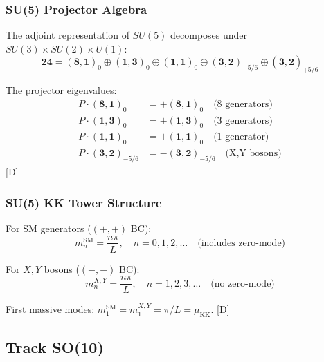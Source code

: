 \documentclass[11pt,a4paper]{article}
\newcommand{\tagD}{\textcolor{blue!70!black}{[D]}}
\begin{document}
\subsubsection{SU(5) Projector Algebra}

The adjoint representation of $SU(5)$ decomposes under $SU(3) \times SU(2) \times U(1)$:
\begin{equation}
\label{eq:su5-adj-decomp}
\mathbf{24} = (\mathbf{8}, \mathbf{1})_0 \oplus (\mathbf{1}, \mathbf{3})_0 \oplus (\mathbf{1}, \mathbf{1})_0
\oplus (\mathbf{3}, \mathbf{2})_{-5/6} \oplus (\bar{\mathbf{3}}, \mathbf{2})_{+5/6}
\end{equation}

The projector eigenvalues:
\begin{align}
\label{eq:su5-proj-sm}
P \cdot (\mathbf{8}, \mathbf{1})_0 &= +(\mathbf{8}, \mathbf{1})_0 \quad \text{(8 generators)} \\
\label{eq:su5-proj-su2}
P \cdot (\mathbf{1}, \mathbf{3})_0 &= +(\mathbf{1}, \mathbf{3})_0 \quad \text{(3 generators)} \\
\label{eq:su5-proj-u1}
P \cdot (\mathbf{1}, \mathbf{1})_0 &= +(\mathbf{1}, \mathbf{1})_0 \quad \text{(1 generator)} \\
\label{eq:su5-proj-xy}
P \cdot (\mathbf{3}, \mathbf{2})_{-5/6} &= -(\mathbf{3}, \mathbf{2})_{-5/6} \quad \text{(X,Y bosons)}
\end{align}
\tagD

\subsubsection{SU(5) KK Tower Structure}

For SM generators ($(+,+)$ BC):
\begin{equation}
\label{eq:su5-kk-sm}
m_n^{\text{SM}} = \frac{n\pi}{L}, \quad n = 0, 1, 2, \ldots \quad \text{(includes zero-mode)}
\end{equation}

For $X, Y$ bosons ($(-,-)$ BC):
\begin{equation}
\label{eq:su5-kk-xy}
m_n^{X,Y} = \frac{n\pi}{L}, \quad n = 1, 2, 3, \ldots \quad \text{(no zero-mode)}
\end{equation}

First massive modes: $m_1^{\text{SM}} = m_1^{X,Y} = \pi/L = \mu_{\text{KK}}$. \tagD

\subsection{Track SO(10)}
\end{document}
